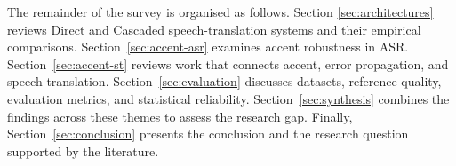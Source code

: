 The remainder of the survey is organised as follows. Section
\ref{sec:architectures} reviews Direct and Cascaded speech-translation systems
and their empirical comparisons. Section~\ref{sec:accent-asr} examines accent
robustness in ASR. Section~\ref{sec:accent-st} reviews work that connects
accent, error propagation, and speech translation. Section~\ref{sec:evaluation}
discusses datasets, reference quality, evaluation metrics, and statistical
reliability. Section~\ref{sec:synthesis} combines the findings across these
themes to assess the research gap. Finally, Section~\ref{sec:conclusion}
presents the conclusion and the research question supported by the literature.

